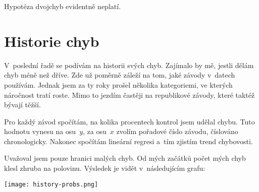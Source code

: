 \documentclass[a4paper,11pt]{article}
\begin{document}
Hypotéza dvojchyb evidentně neplatí.

\section*{Historie chyb}

V~poslední řadě se podívám na historii svých chyb. Zajímalo by mě, jestli dělám
chyb méně než dříve. Zde už poměrně záleží na tom, jaké závody v~datech
používám. Jednak jsem za ty roky prošel několika kategoriemi, ve kterých
náročnost tratí roste. Mimo to jezdím častěji na republikové závody, které
taktéž bývají těžší.

Pro každý závod spočítám, na kolika procentech kontrol jsem udělal chybu. Tuto
hodnotu vynesu na osu~$y$, za osu~$x$ zvolím pořadové číslo závodu, číslováno
chronologicky. Nakonec spočítám lineární regresi a~tím zjistím trend chybovosti.

Uvažoval jsem pouze hranici malých chyb. Od mých začátků počet mých chyb klesl
zhruba na polovinu. Výsledek je vidět v~následujícím grafu:

\begin{center}
    \texttt{[image: history-probs.png]}
\end{center}
\end{document}
